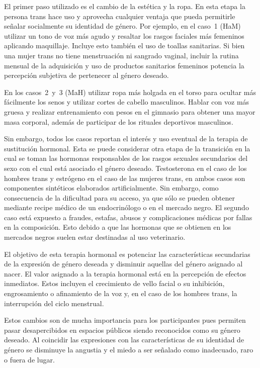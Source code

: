 El primer paso utilizado es el cambio de la estética y la ropa. En esta etapa la
persona trans hace uso y aprovecha cualquier ventaja que pueda permitirle
señalar socialmente su identidad de género. Por ejemplo, en el caso~1 (HaM)
utilizar un tono de voz más agudo y resaltar los rasgos faciales más femeninos
aplicando maquillaje. Incluye esto también el uso de toallas sanitarias. Si bien
una mujer trans no tiene menstruación ni sangrado vaginal, incluir la rutina
mensual de la adquisición y uso de productos sanitarios femeninos potencia la
percepción subjetiva de pertenecer al género deseado.

En los casos~2~y~3 (MaH) utilizar ropa más holgada en el torso para ocultar más
fácilmente los senos y utilizar cortes de cabello masculinos. Hablar con voz más
gruesa y realizar entrenamiento con pesos en el gimnasio para obtener una mayor
masa corporal, además de participar de los rituales deportivos masculinos.

Sin embargo, todos los casos reportan el interés y uso eventual de la terapia de
sustitución hormonal. Esta se puede considerar otra etapa de la transición en la
cual se toman las hormonas responsables de los rasgos sexuales secundarios del
sexo con el cual está asociado el género deseado. Testosterona en el caso de los
hombres trans y estrógeno en el caso de las mujeres trans, en ambos casos son
componentes sintéticos elaborados artificialmente. Sin embargo, como
consecuencia de la dificultad para su acceso, ya que sólo se pueden obtener
mediante recipe médico de un endocrinólogo o en el mercado negro. El segundo
caso está expuesto a fraudes, estafas, abusos y complicaciones médicas por
fallas en la composición. Esto debido a que las hormonas que se obtienen en los
mercados negros suelen estar destinadas al uso veterinario.

El objetivo de esta terapia hormonal es potenciar las características
secundarias de la expresión de género deseada y disminuir aquellas del género
asignado al nacer. El valor asignado a la terapia hormonal está en la percepción
de efectos inmediatos. Estos incluyen el crecimiento de vello facial o su
inhibición, engrosamiento o afinamiento de la voz y, en el caso de los hombres
trans, la interrupción del ciclo menstrual.

Estos cambios son de mucha importancia para los participantes pues permiten
pasar desapercibidos en espacios públicos siendo reconocidos como su género
deseado. Al coincidir las expresiones con las características de su identidad de
género se disminuye la angustia y el miedo a ser señalado como inadecuado, raro
o fuera de lugar.

